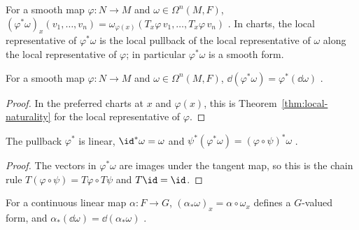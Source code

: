 \begin{definition}[Pullback]
  \label{def:diff-form-pullback}
  \leanok
  For a smooth map $\varphi \colon N \to M$ and $\omega \in \Omega^n(M, F)$,
  $(\varphi^*\omega)_x(v_1, \dots, v_n) = \omega_{\varphi(x)}(T_x\varphi\, v_1, \dots,
  T_x\varphi\, v_n)$ \cite[Definition~3.6.6]{GN26}. In charts, the local representative of
  $\varphi^*\omega$ is the local pullback of the local representative of $\omega$ along the local
  representative of $\varphi$; in particular $\varphi^*\omega$ is a smooth form.
\end{definition}

\begin{theorem}[Naturality of $\dd$]
  \label{thm:diff-form-naturality}
  \leanok
  For a smooth map $\varphi \colon N \to M$ and $\omega \in \Omega^n(M, F)$,
  $\dd(\varphi^*\omega) = \varphi^*(\dd\omega)$ \cite[Lemma~3.6.13]{GN26}.
\end{theorem}

\begin{proof}
  \leanok
  In the preferred charts at $x$ and $\varphi(x)$, this is Theorem~\ref{thm:local-naturality}
  for the local representative of $\varphi$.
\end{proof}

\begin{proposition}
  \label{prop:pullback-functorial}
  \leanok
  The pullback $\varphi^*$ is linear, $\id^*\omega = \omega$ and
  $\psi^*(\varphi^*\omega) = (\varphi \circ \psi)^*\omega$ \cite[(3.27)]{GN26}.
\end{proposition}

\begin{proof}
  \leanok
  The vectors in $\varphi^*\omega$ are images under the tangent map, so this is the chain rule
  $T(\varphi \circ \psi) = T\varphi \circ T\psi$ and $T\id = \id$.
\end{proof}

\begin{proposition}
  \label{prop:d-comp-clm}
  \leanok
  For a continuous linear map $\alpha \colon F \to G$, $(\alpha_*\omega)_x = \alpha \circ
  \omega_x$ defines a $G$-valued form, and $\alpha_*(\dd\omega) = \dd(\alpha_*\omega)$
  \cite[Exercise~3.6.4]{GN26}.
\end{proposition}

